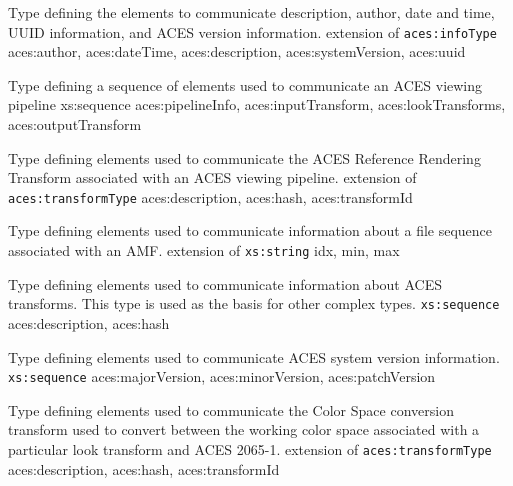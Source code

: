             {Type defining the elements to communicate description, author, date and time, UUID information, and ACES version information.}
            {extension of \texttt{aces:infoType}}
            {aces:author, aces:dateTime, aces:description, aces:systemVersion, aces:uuid}
            
            {Type defining a sequence of elements used to communicate an ACES viewing pipeline}
            {xs:sequence}
            {aces:pipelineInfo, aces:inputTransform, aces:lookTransforms,\\ aces:outputTransform}
 
            {Type defining elements used to communicate the ACES Reference Rendering Transform associated with an ACES viewing pipeline.}
            {extension of \texttt{aces:transformType}}
            {aces:description, aces:hash, aces:transformId}

\newpage
                {Type defining elements used to communicate information about a file sequence associated with an AMF.}
                {extension of \texttt{xs:string}}
                {idx, min, max}

            {Type defining elements used to communicate information about ACES transforms.  This type is used as the basis for other complex types.}
            {\texttt{xs:sequence}}
            {aces:description, aces:hash}

            {Type defining elements used to communicate ACES system version information.}
            {\texttt{xs:sequence}}
            {aces:majorVersion, aces:minorVersion, aces:patchVersion}

            {Type defining elements used to communicate the Color Space conversion transform used to convert between the working color space associated with a particular look transform and ACES 2065-1.}
            {extension of \texttt{aces:transformType}}
            {aces:description, aces:hash, aces:transformId}
